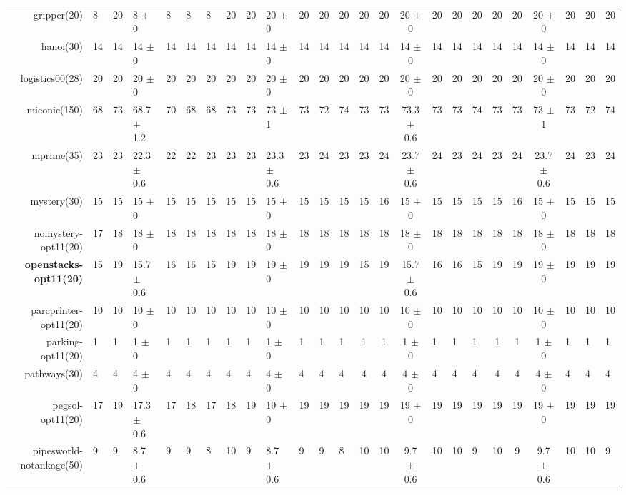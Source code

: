 \begin{center}
\begin{tabular}{|rHHHHHHHHHHHHcccHHH|cccHHH|}
gripper(20) & 8 & 20 & 8 $\pm$ 0 & 8 & 8 & 8 & 20 & 20 & 20 $\pm$ 0 & 20 & 20 & 20 & 20 & 20 & 20 $\pm$ 0 & 20 & 20 & 20 & 20 & 20 & 20 $\pm$ 0 & 20 & 20 & 20\\
hanoi(30) & 14 & 14 & 14 $\pm$ 0 & 14 & 14 & 14 & 14 & 14 & 14 $\pm$ 0 & 14 & 14 & 14 & 14 & 14 & 14 $\pm$ 0 & 14 & 14 & 14 & 14 & 14 & 14 $\pm$ 0 & 14 & 14 & 14\\
logistics00(28) & 20 & 20 & 20 $\pm$ 0 & 20 & 20 & 20 & 20 & 20 & 20 $\pm$ 0 & 20 & 20 & 20 & 20 & 20 & 20 $\pm$ 0 & 20 & 20 & 20 & 20 & 20 & 20 $\pm$ 0 & 20 & 20 & 20\\
miconic(150) & 68 & 73 & 68.7 $\pm$ 1.2 & 70 & 68 & 68 & 73 & 73 & 73 $\pm$ 1 & 73 & 72 & 74 & 73 & 73 & 73.3 $\pm$ 0.6 & 73 & 73 & 74 & 73 & 73 & 73 $\pm$ 1 & 73 & 72 & 74\\
mprime(35) & 23 & 23 & 22.3 $\pm$ 0.6 & 22 & 22 & 23 & 23 & 23 & 23.3 $\pm$ 0.6 & 23 & 24 & 23 & 23 & 24 & 23.7 $\pm$ 0.6 & 24 & 23 & 24 & 23 & 24 & 23.7 $\pm$ 0.6 & 24 & 23 & 24\\
mystery(30) & 15 & 15 & 15 $\pm$ 0 & 15 & 15 & 15 & 15 & 15 & 15 $\pm$ 0 & 15 & 15 & 15 & 15 & 16 & 15 $\pm$ 0 & 15 & 15 & 15 & 15 & 16 & 15 $\pm$ 0 & 15 & 15 & 15\\
nomystery-opt11(20) & 17 & 18 & 18 $\pm$ 0 & 18 & 18 & 18 & 18 & 18 & 18 $\pm$ 0 & 18 & 18 & 18 & 18 & 18 & 18 $\pm$ 0 & 18 & 18 & 18 & 18 & 18 & 18 $\pm$ 0 & 18 & 18 & 18\\
\textbf{openstacks-opt11(20)} & 15 & 19 & 15.7 $\pm$ 0.6 & 16 & 16 & 15 & 19 & 19 & 19 $\pm$ 0 & 19 & 19 & 19 & 15 & 19 & 15.7 $\pm$ 0.6 & 16 & 16 & 15 & 19 & 19 & 19 $\pm$ 0 & 19 & 19 & 19\\
parcprinter-opt11(20) & 10 & 10 & 10 $\pm$ 0 & 10 & 10 & 10 & 10 & 10 & 10 $\pm$ 0 & 10 & 10 & 10 & 10 & 10 & 10 $\pm$ 0 & 10 & 10 & 10 & 10 & 10 & 10 $\pm$ 0 & 10 & 10 & 10\\
parking-opt11(20) & 1 & 1 & 1 $\pm$ 0 & 1 & 1 & 1 & 1 & 1 & 1 $\pm$ 0 & 1 & 1 & 1 & 1 & 1 & 1 $\pm$ 0 & 1 & 1 & 1 & 1 & 1 & 1 $\pm$ 0 & 1 & 1 & 1\\
pathways(30) & 4 & 4 & 4 $\pm$ 0 & 4 & 4 & 4 & 4 & 4 & 4 $\pm$ 0 & 4 & 4 & 4 & 4 & 4 & 4 $\pm$ 0 & 4 & 4 & 4 & 4 & 4 & 4 $\pm$ 0 & 4 & 4 & 4\\
pegsol-opt11(20) & 17 & 19 & 17.3 $\pm$ 0.6 & 17 & 18 & 17 & 18 & 19 & 19 $\pm$ 0 & 19 & 19 & 19 & 19 & 19 & 19 $\pm$ 0 & 19 & 19 & 19 & 19 & 19 & 19 $\pm$ 0 & 19 & 19 & 19\\
pipesworld-notankage(50) & 9 & 9 & 8.7 $\pm$ 0.6 & 9 & 9 & 8 & 10 & 9 & 8.7 $\pm$ 0.6 & 9 & 9 & 8 & 10 & 10 & 9.7 $\pm$ 0.6 & 10 & 10 & 9 & 10 & 9 & 9.7 $\pm$ 0.6 & 10 & 10 & 9\\

\end{tabular}
\end{center}
